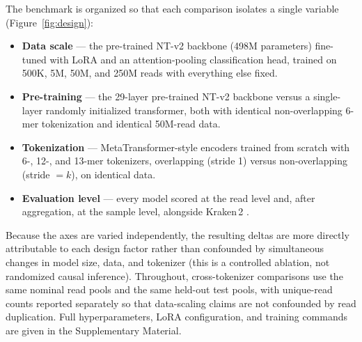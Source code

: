 The benchmark is organized so that each comparison isolates a single variable
(Figure~\ref{fig:design}):
\begin{itemize}\setlength{\itemsep}{2pt}
  \item \textbf{Data scale} --- the pre-trained NT-v2 backbone (498M
        parameters) fine-tuned with LoRA \citep{Hu2022} and an
        attention-pooling classification head, trained on 500K, 5M, 50M, and
        250M reads with everything else fixed.
  \item \textbf{Pre-training} --- the 29-layer pre-trained NT-v2 backbone
        versus a single-layer randomly initialized transformer, both with
        identical non-overlapping 6-mer tokenization and identical 50M-read
        data.
  \item \textbf{Tokenization} --- MetaTransformer-style encoders trained from
        scratch with 6-, 12-, and 13-mer tokenizers, overlapping (stride 1)
        versus non-overlapping (stride $=k$), on identical data.
  \item \textbf{Evaluation level} --- every model scored at the read level and,
        after aggregation, at the sample level, alongside Kraken\,2
        \citep{Wood2019}.
\end{itemize}
Because the axes are varied independently, the resulting deltas are more directly
attributable to each design factor rather than confounded by simultaneous changes
in model size, data, and tokenizer (this is a controlled ablation, not randomized
causal inference). Throughout, cross-tokenizer comparisons use the same nominal
read pools and the same held-out test pools, with unique-read counts reported
separately so that data-scaling claims are not confounded by read duplication.
Full hyperparameters, LoRA configuration, and training commands are given in the
Supplementary Material.

